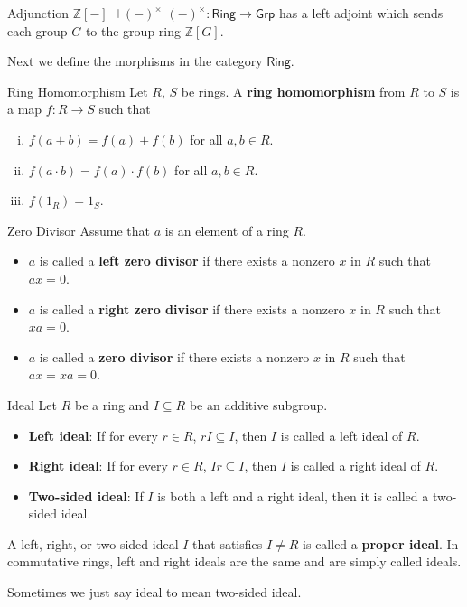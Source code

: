 \begin{proposition}{Adjunction $\mathbb{Z}\left[-\right]\dashv \left(-\right)^\times$}{}
    $(-)^\times:\mathsf{Ring}\to\mathsf{Grp}$ has a left adjoint which sends each group $G$ to the group ring $\mathbb{Z}\left[G\right]$.
\end{proposition}


Next we define the morphisms in the category $\mathsf{Ring}$.
\begin{definition}{Ring Homomorphism}{}
    Let $R$, $S$ be rings. A \textbf{ring homomorphism} from $R$ to $S$ is a map $f:R\to S$ such that
    \begin{enumerate}[(i)]
        \item $f(a+b)=f(a)+f(b)$ for all $a,b\in R$.
        \item $f(a\cdot b)=f(a)\cdot f(b)$ for all $a,b\in R$.
        \item $f(1_R)=1_S$.
    \end{enumerate}
\end{definition}




\begin{definition}{Zero Divisor}{}
    Assume that $a$ is an element of a ring $R$. 
    \begin{itemize}
        \item $a$ is called a \textbf{left zero divisor} if there exists a nonzero $x$ in $R$ such that $ax = 0$.
        \item $a$ is called a \textbf{right zero divisor} if there exists a nonzero $x$ in $R$ such that $xa = 0$.
        \item $a$ is called a \textbf{zero divisor} if there exists a nonzero $x$ in $R$ such that $ax = xa = 0$.
    \end{itemize}
\end{definition}

\begin{definition}{Ideal}{}
    Let \( R \) be a ring and \( I \subseteq R \) be an additive subgroup.
    \begin{itemize}
        \item \textbf{Left ideal}: If for every \( r \in R \), \( rI \subseteq I \), then \( I \) is called a left ideal of \( R \).
        \item \textbf{Right ideal}: If for every \( r \in R \), \( Ir \subseteq I \), then \( I \) is called a right ideal of \( R \).
        \item \textbf{Two-sided ideal}: If \( I \) is both a left and a right ideal, then it is called a two-sided ideal.
    \end{itemize}

A left, right, or two-sided ideal \( I \) that satisfies \( I \ne R \) is called a \textbf{proper ideal}. In commutative rings, left and right ideals are the same and are simply called ideals. 
\end{definition}
Sometimes we just say ideal to mean two-sided ideal.

